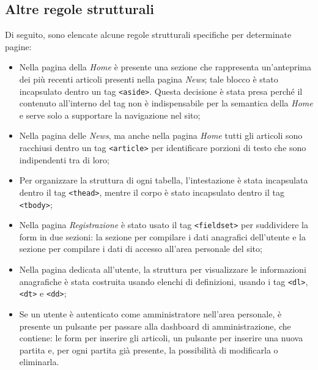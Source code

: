     \subsection{Altre regole strutturali}
    Di seguito, sono elencate alcune regole strutturali specifiche per determinate pagine:
    \begin{itemize}
        \item Nella pagina della \textit{Home} è presente una sezione che rappresenta un'anteprima dei più recenti articoli presenti nella pagina \textit{News}; tale blocco è stato incapsulato dentro un tag \texttt{<aside>}. Questa decisione è stata presa perché il contenuto all'interno del tag non è indispensabile per la semantica della \textit{Home} e serve solo a supportare la navigazione nel sito;
        \item Nella pagina delle \textit{News}, ma anche nella pagina \textit{Home} tutti gli articoli sono racchiusi dentro un tag \texttt{<article>} per identificare porzioni di testo che sono indipendenti tra di loro;
        \item Per organizzare la struttura di ogni tabella, l'intestazione è stata incapsulata dentro il tag \texttt{<thead>}, mentre il corpo è stato incapsulato dentro il tag \texttt{<tbody>};
        \item Nella pagina \textit{Registrazione} è stato usato il tag \texttt{<fieldset>} per suddividere la form in due sezioni: la sezione per compilare i dati anagrafici dell'utente e la sezione per compilare i dati di accesso all'area personale del sito;
        \item Nella pagina dedicata all'utente, la struttura per visualizzare le informazioni anagrafiche è stata costruita usando elenchi di definizioni, usando i tag \texttt{<dl>}, \texttt{<dt>} e \texttt{<dd>};
        \item Se un utente è autenticato come amministratore nell'area personale, è presente un pulsante per passare alla dashboard di amministrazione, che contiene: le form per inserire gli articoli, un pulsante per inserire una nuova partita e, per ogni partita già presente, la possibilità di modificarla o eliminarla.
    \end{itemize}